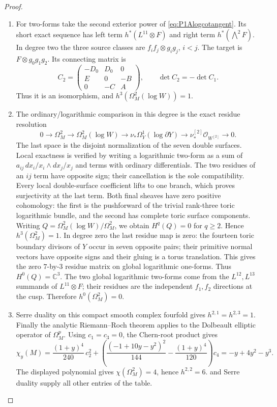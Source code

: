 \documentclass[11pt,a4paper]{article}
\numberwithin{equation}{section}
\theoremstyle{definition}
\begin{document}
\begin{proof}
\begin{enumerate}[label=\arabic*.]
\item For two-forms take the second exterior power of
\eqref{eq:P1Alogcotangent}. Its short exact sequence has left
term $h^*(L^{11}\otimes F)$ and right term
$h^*(\bigwedge^2F)$. In degree two the three source classes
are $f_if_j\otimes g_ig_j$, $i<j$. The target is
$F\otimes g_0g_1g_2$. Its connecting matrix is
\[
C_2=\begin{pmatrix}-D_0&D_0&0\\E&0&-B\\0&-C&A\end{pmatrix},
\qquad \det C_2=-\det C_1.
\]
Thus it is an isomorphism, and
$h^3(\Omega_M^2(\log W))=1$.

\item The ordinary/logarithmic comparison in this degree is the
exact residue resolution
\[
0\to\Omega_M^2\to\Omega_M^2(\log W)
 \to\nu_*\Omega_Y^1(\log\partial Y)
 \to\nu^{[2]}_*\mathcal O_{W^{[2]}}\to0.
\]
The last space is the disjoint normalization of the seven
double surfaces. Local exactness is verified by writing a
logarithmic two-form as a sum of
$a_{ij}\,dx_i/x_i\wedge dx_j/x_j$ and terms with ordinary
differentials. The two residues of an $ij$ term have opposite
sign; their cancellation is the sole compatibility. Every local
double-surface coefficient lifts to one branch, which proves
surjectivity at the last term.
Both final sheaves have zero positive cohomology: the first
is the pushforward of the trivial rank-three toric logarithmic
bundle, and the second has complete toric surface components.
Writing $Q=\Omega_M^2(\log W)/\Omega_M^2$, we obtain
$H^q(Q)=0$ for $q\ge2$. Hence
$h^3(\Omega_M^2)=1$.
In degree zero the last residue map is zero: the fourteen toric
boundary divisors of $Y$ occur in seven opposite pairs; their
primitive normal vectors have opposite signs and their gluing
is a torus translation. This gives the zero $7$-by-$3$ residue
matrix on global logarithmic one-forms. Thus $H^0(Q)=\mathbb C^3$.
The two global logarithmic two-forms come from the
$L^{12},L^{13}$ summands of $L^{11}\otimes F$; their residues
are the independent $f_1,f_2$ directions at the cusp.
Therefore $h^0(\Omega_M^2)=0$.

\item Serre duality \cite[Theorem 4, p.~22]{Serre1955Duality} on this compact smooth complex fourfold gives
$h^{2,1}=h^{2,3}=1$. Finally the analytic Riemann--Roch theorem
\cite[Theorem 25.3.1, p.~187; \S25.4(a), pp.~188--190]{HirzebruchTopologicalMethods} applies to the Dolbeault elliptic
operator of $\Omega_M^p$.
Using $c_1=c_3=0$, the Chern-root product gives
\[
\chi_y(M)=
\frac{(1+y)^4}{240}\,c_2^2+
\left(\frac{(-1+10y-y^2)^2}{144}
       -\frac{(1+y)^4}{120}\right)c_4
=-y+4y^2-y^3.
\]
The displayed polynomial gives
$\chi(\Omega_M^2)=4$, hence $h^{2,2}=6$.
 and Serre duality supply all other entries of the table.

\end{enumerate}
\end{proof}
\end{document}
